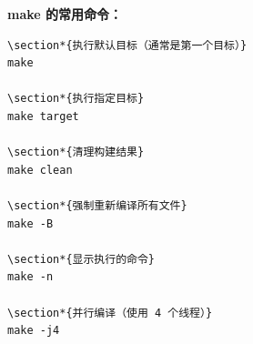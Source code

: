 \documentclass[12pt,UTF8]{ctexbook}
\begin{document}
\textbf{make 的常用命令：}
\begin{verbatim}
\section*{执行默认目标（通常是第一个目标）}
make

\section*{执行指定目标}
make target

\section*{清理构建结果}
make clean

\section*{强制重新编译所有文件}
make -B

\section*{显示执行的命令}
make -n

\section*{并行编译（使用 4 个线程）}
make -j4
\end{verbatim}
\end{document}
